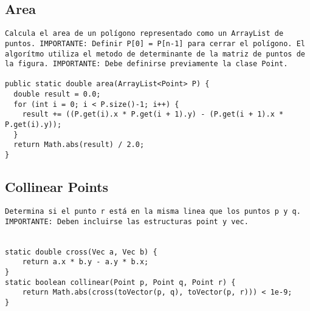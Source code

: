 \documentclass[10pt,letterpaper,twocolumn,twosided]{article}
\begin{document}
\subsection{Area}
\begin{lstlisting}
Calcula el area de un polígono representado como un ArrayList de puntos. IMPORTANTE: Definir P[0] = P[n-1] para cerrar el polígono. El algorítmo utiliza el metodo de determinante de la matriz de puntos de la figura. IMPORTANTE: Debe definirse previamente la clase Point.

public static double area(ArrayList<Point> P) {
  double result = 0.0;
  for (int i = 0; i < P.size()-1; i++) {
   	result += ((P.get(i).x * P.get(i + 1).y) - (P.get(i + 1).x * P.get(i).y));
  }
  return Math.abs(result) / 2.0; 
}
\end{lstlisting}

\subsection{Collinear Points}
\begin{lstlisting}
Determina si el punto r está en la misma linea que los puntos p y q. IMPORTANTE: Deben incluirse las estructuras point y vec.


static double cross(Vec a, Vec b) { 
	return a.x * b.y - a.y * b.x; 
}
static boolean collinear(Point p, Point q, Point r) {
	return Math.abs(cross(toVector(p, q), toVector(p, r))) < 1e-9; 
}
\end{lstlisting}
\end{document}
